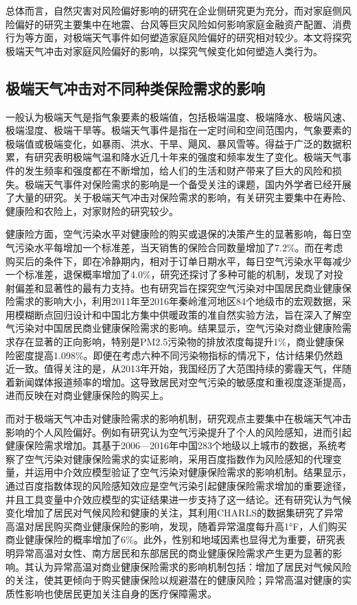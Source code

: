 总体而言，自然灾害对风险偏好影响的研究在企业侧研究更为充分，而对家庭侧风险偏好的研究主要集中在地震、台风等巨灾风险如何影响家庭金融资产配置、消费行为等方面，对极端天气事件如何塑造家庭风险偏好的研究相对较少。本文将探究极端天气冲击对家庭风险偏好的影响，以探究气候变化如何塑造人类行为。

\subsection{极端天气冲击对不同种类保险需求的影响}

一般认为极端天气是指气象要素的极端值，包括极端温度、极端降水、极端风速、极端湿度、极端干旱等\citep{傅良2022ECMWF,吴大明2021近年来全球极端天气气候事件情况及影响分析}。极端天气事件是指在一定时间和空间范围内，气象要素的极端值或极端变化，如暴雨、洪水、干旱、飓风、暴风雪等。得益于广泛的数据积累，有研究表明极端气温和降水近几十年来的强度和频率发生了变化\citep{ummenhofer2017extreme}。极端天气事件的发生频率和强度都在不断增加，给人们的生活和财产带来了巨大的风险和损失。极端天气事件对保险需求的影响是一个备受关注的课题，国内外学者已经开展了大量的研究。关于极端天气冲击对保险需求的影响，有关研究主要集中在寿险、健康险和农险上，对家财险的研究较少。

健康险方面，空气污染水平对健康险的购买或退保的决策产生的显著影响\citep{2018Something}，每日空气污染水平每增加一个标准差，当天销售的保险合同数量增加了7.2\%。而在考虑购买后的条件下，即在冷静期内，相对于订单日期水平，每日空气污染水平每减少一个标准差，退保概率增加了4.0\%，研究还探讨了多种可能的机制，发现了对投射偏差和显著性的最有力支持。也有研究旨在探究空气污染对中国居民商业健康保险需求的影响大小\citep{赵强2021空气污染对商业健康保险需求的影响}，利用2011年至2016年秦岭淮河地区84个地级市的宏观数据，采用模糊断点回归设计和中国北方集中供暖政策的准自然实验方法，旨在深入了解空气污染对中国居民商业健康保险需求的影响。结果显示，空气污染对商业健康险需求存在显著的正向影响，特别是PM2.5污染物的排放浓度每提升1\%，商业健康保险密度提高1.098\%。即便在考虑六种不同污染物指标的情况下，估计结果仍然趋近一致。值得关注的是，从2013年开始，我国经历了大范围持续的雾霾天气，伴随着新闻媒体报道频率的增加。这导致居民对空气污染的敏感度和重视度逐渐提高，进而反映在对商业健康保险的购买上。

而对于极端天气冲击对健康险需求的影响机制，研究观点主要集中在极端天气冲击影响的个人风险偏好。例如有研究认为空气污染提升了个人的风险感知，进而引起健康保险需求增加\citep{宋平凡2022空气污染}。其基于2006—2016年中国283个地级以上城市的数据，系统考察了空气污染对健康保险需求的实证影响，采用百度指数作为风险感知的代理变量，并运用中介效应模型验证了空气污染对健康保险需求的影响机制。结果显示，通过百度指数体现的风险感知效应是空气污染引起健康保险需求增加的重要途径，并且工具变量中介效应模型的实证结果进一步支持了这一结论。还有研究认为气候变化增加了居民对气候风险和健康的关注\cite{zhong2022exposure}，其利用CHARLS的数据集研究了异常高温对居民购买商业健康保险的影响，发现，随着异常温度每升高1°F，人们购买商业健康保险的概率增加了6\%。此外，性别和地域因素也显得尤为重要，研究表明异常高温对女性、南方居民和东部居民的商业健康保险需求产生更为显著的影响。其认为异常高温对商业健康保险需求的影响机制包括：增加了居民对气候风险的关注，使其更倾向于购买健康保险以规避潜在的健康风险；异常高温对健康的实质性影响也使居民更加关注自身的医疗保障需求。

